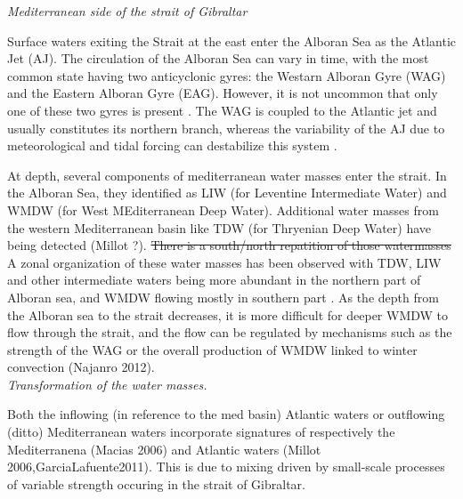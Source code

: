 \color{blue}\textit{Mediterranean side of the strait of Gibraltar} \color{black}


Surface waters exiting the Strait at the east enter the Alboran Sea as the Atlantic Jet (AJ). The circulation of the Alboran Sea \color{blue}can vary in time\color{blue}, with the most common state having two anticyclonic gyres: \color{blue}the Westarn Alboran Gyre (WAG) and the Eastern Alboran Gyre (EAG)\color{black}. \color{blue}However, it is \color{black} not uncommon that only one of \color{blue}these two gyres \color{blue} is present \citep{millot_2005}. The WAG is coupled to the Atlantic jet \color{blue}and \color{black} usually constitutes its northern branch,  \color{blue}whereas the \color{black} variability of the AJ due to meteorological and tidal forcing can destabilize this system \citep{sanchez-garrido_2013,lorente_2019}.

At depth, several \color{blue}components of \color{black} mediterranean water masses enter the strait. In the Alboran Sea, \color{blue}they \color{black}identified as LIW (for Leventine Intermediate Water) and WMDW (for West MEditerranean Deep Water). \color{blue} Additional water masses from the western Mediterranean basin \color{blue} like TDW (for Thryenian Deep Water) \color{blue}have \color{black} being detected  \color{blue}(Millot ?)\color{black}. \sout{There is a south/north repatition of those watermasses} A zonal organization of these water masses has been observed \color{black} with TDW, LIW and other intermediate waters being more abundant in the northern part of Alboran sea, and WMDW flowing \color{blue}mostly \color{black} in southern part \citep{millot_2014}. As the depth from the Alboran sea to the strait decreases, it is more difficult for deeper WMDW to \color{blue}flow through the \color{black} strait, and the flow can be regulated by mechanisms such as the strength of the WAG or the overall production of WMDW linked to winter convection (Najanro 2012).\\


\color{blue}\textit{Transformation of the water masses.} \color{black}

\color{blue}Both the inflowing (in reference to the med basin) Atlantic waters or outflowing (ditto) Mediterranean waters incorporate \color{black} signatures of respectively the Mediterranena (Macias 2006) and Atlantic waters (Millot 2006,GarciaLafuente2011). This is due to mixing driven by small-scale processes of variable strength \color{blue}occuring in the strait of Gibraltar. \color{black} 


